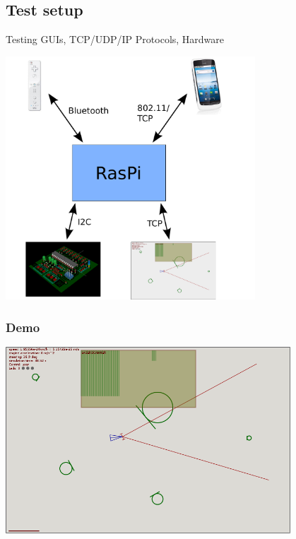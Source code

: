 \documentclass[pdf]{beamer}
\begin{document}
\subsection{Test setup}
\begin{frame}
Testing GUIs, TCP/UDP/IP Protocols, Hardware
  \begin{center}
  \includegraphics[width = 0.7\textwidth]{pics/raw/software2.pdf}
  \end{center}
\end{frame}
\begin{frame}
\frametitle{Demo}
  \begin{center}
  \includegraphics[width = 0.8\textwidth]{pics/raw/sim.png}
  \end{center}
\end{frame}
\end{document}
